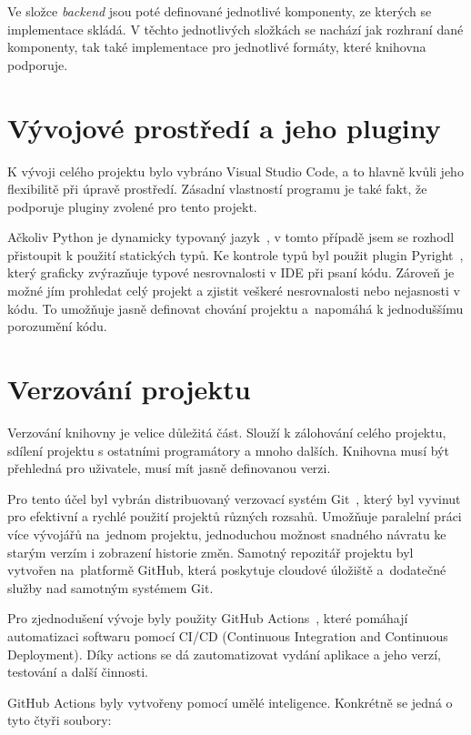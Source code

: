 Ve složce \textit{backend} jsou poté definované jednotlivé komponenty, ze kterých se implementace skládá. V těchto jednotlivých složkách se nachází jak rozhraní dané komponenty, tak také implementace pro jednotlivé formáty, které knihovna podporuje.

\section{Vývojové prostředí a jeho pluginy}

K vývoji celého projektu bylo vybráno Visual Studio Code, a to hlavně kvůli jeho flexibilitě při úpravě prostředí. Zásadní vlastností programu je také fakt, že podporuje pluginy zvolené pro tento projekt. 

Ačkoliv Python je dynamicky typovaný jazyk~\cite{PythonConcepts}, v tomto případě jsem se rozhodl přistoupit k použití statických typů. Ke kontrole typů byl použit plugin Pyright~\cite{Pyright}, který graficky zvýrazňuje typové nesrovnalosti v IDE při psaní kódu. Zároveň je možné jím prohledat celý projekt a zjistit veškeré nesrovnalosti nebo nejasnosti v kódu. To umožňuje jasně definovat chování projektu a~napomáhá k jednoduššímu porozumění kódu.

\section{Verzování projektu}

Verzování knihovny je velice důležitá část. Slouží k zálohování celého projektu, sdílení projektu s ostatními programátory a mnoho dalších. Knihovna musí být přehledná pro uživatele, musí mít jasně definovanou verzi.

Pro tento účel byl vybrán distribuovaný verzovací systém Git~\cite{Git}, který byl vyvinut pro efektivní a rychlé použití projektů různých rozsahů. Umožňuje paralelní práci více vývojářů na~jednom projektu, jednoduchou možnost snadného návratu ke starým verzím i zobrazení historie změn. Samotný repozitář projektu byl vytvořen na~platformě GitHub, která poskytuje cloudové úložiště a~dodatečné služby nad samotným systémem Git.

Pro zjednodušení vývoje byly použity GitHub Actions~\cite{githubActions}, které pomáhají automatizaci softwaru pomocí CI/CD (Continuous Integration and Continuous Deployment). Díky actions se dá zautomatizovat vydání aplikace a jeho verzí, testování a další činnosti.

GitHub Actions byly vytvořeny pomocí umělé inteligence. Konkrétně se jedná o tyto čtyři soubory:

